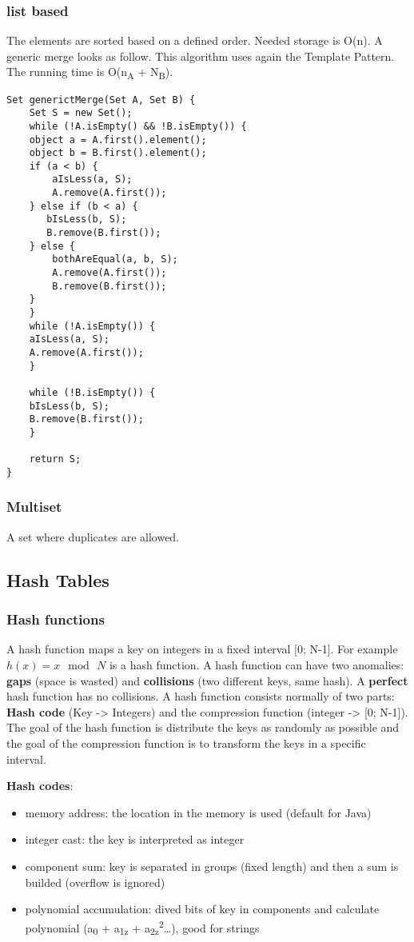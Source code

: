 \documentclass[11pt,twoside,landscape]{article}
\begin{document}
\begin{multicols}{2}
\subsubsection*{list based}
\label{sec:org9cfdfc3}
The elements are sorted based on a defined order. Needed storage is O(n). A generic merge looks as follow. This algorithm uses again the Template Pattern. The running time is O(n\textsubscript{A} + N\textsubscript{B}).
\begin{verbatim}
Set generictMerge(Set A, Set B) {
    Set S = new Set();
    while (!A.isEmpty() && !B.isEmpty()) {
	object a = A.first().element();
	object b = B.first().element();
	if (a < b) {
	    aIsLess(a, S);
	    A.remove(A.first());
	} else if (b < a) {
	   bIsLess(b, S);
	   B.remove(B.first()); 
	} else {
	    bothAreEqual(a, b, S);
	    A.remove(A.first());
	    B.remove(B.first());
	}
    }
    while (!A.isEmpty()) {
	aIsLess(a, S);
	A.remove(A.first());
    }

    while (!B.isEmpty()) {
	bIsLess(b, S);
	B.remove(B.first());
    }

    return S;
}
\end{verbatim}
\subsubsection*{Multiset}
\label{sec:org2a71731}
A set where duplicates are allowed.

\subsection*{Hash Tables}
\label{sec:orgff24281}
\subsubsection*{Hash functions}
\label{sec:orga9d498c}
A hash function maps a key on integers in a fixed interval [0; N-1]. For example \(h(x) = x \mod \, N\) is a hash function. A hash function can have two anomalies: \textbf{gaps} (space is wasted) and \textbf{collisions} (two different keys, same hash). A \textbf{perfect} hash function has no collisions. A hash function consists normally of two parts: \textbf{Hash code} (Key -> Integers) and the compression function (integer -> [0; N-1]). The goal of the hash function is distribute the keys as randomly as possible and the goal of the compression function is to transform the keys in a specific interval.

\textbf{Hash codes}:
\begin{itemize}
\item memory address: the location in the memory is used (default for Java)
\item integer cast: the key is interpreted as integer
\item component sum: key is separated in groups (fixed length) and then a sum is builded (overflow is ignored)
\item polynomial accumulation: dived bits of key in components and calculate polynomial (a\textsubscript{0} + a\textsubscript{1z} + a\textsubscript{2z}\textsuperscript{2}\ldots{}), good for strings
\end{itemize}



\end{multicols}
\end{document}
